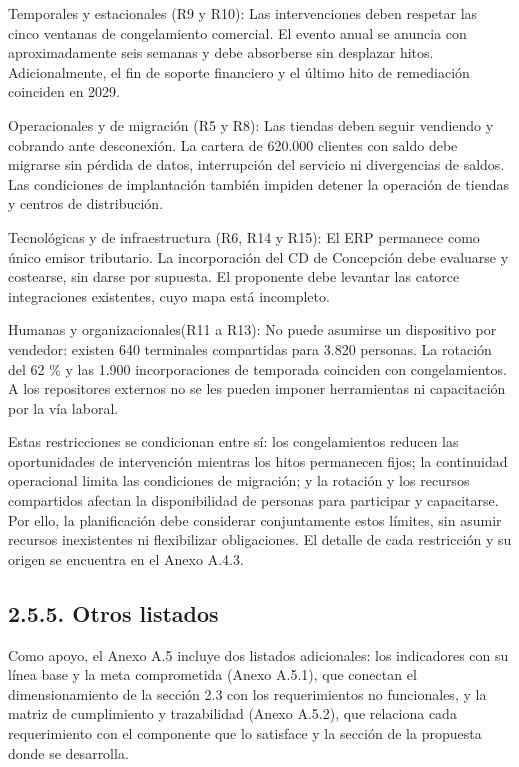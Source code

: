 \documentclass[11pt]{article}
\begin{document}
Temporales y estacionales (R9 y R10): Las intervenciones deben respetar las cinco ventanas de congelamiento comercial. El evento anual se anuncia con aproximadamente seis semanas y debe absorberse sin desplazar hitos. Adicionalmente, el fin de soporte financiero y el último hito de remediación coinciden en 2029.

Operacionales y de migración (R5 y R8): Las tiendas deben seguir vendiendo y cobrando ante desconexión. La cartera de 620.000 clientes con saldo debe migrarse sin pérdida de datos, interrupción del servicio ni divergencias de saldos. Las condiciones de implantación también impiden detener la operación de tiendas y centros de distribución.

Tecnológicas y de infraestructura (R6, R14 y R15): El ERP permanece como único emisor tributario. La incorporación del CD de Concepción debe evaluarse y costearse, sin darse por supuesta. El proponente debe levantar las catorce integraciones existentes, cuyo mapa está incompleto.

Humanas y organizacionales(R11 a R13): No puede asumirse un dispositivo por vendedor: existen 640 terminales compartidas para 3.820 personas. La rotación del 62 \% y las 1.900 incorporaciones de temporada coinciden con congelamientos. A los repositores externos no se les pueden imponer herramientas ni capacitación por la vía laboral.

Estas restricciones se condicionan entre sí: los congelamientos reducen las oportunidades de intervención mientras los hitos permanecen fijos; la continuidad operacional limita las condiciones de migración; y la rotación y los recursos compartidos afectan la disponibilidad de personas para participar y capacitarse. Por ello, la planificación debe considerar conjuntamente estos límites, sin asumir recursos inexistentes ni flexibilizar obligaciones. El detalle de cada restricción y su origen se encuentra en el Anexo A.4.3.

\subsection{2.5.5. Otros listados}\label{otros-listados}

Como apoyo, el Anexo A.5 incluye dos listados adicionales: los indicadores con su línea base y la meta comprometida (Anexo A.5.1), que conectan el dimensionamiento de la sección 2.3 con los requerimientos no funcionales, y la matriz de cumplimiento y trazabilidad (Anexo A.5.2), que relaciona cada requerimiento con el componente que lo satisface y la sección de la propuesta donde se desarrolla.
\end{document}
